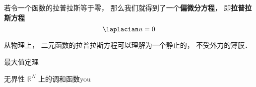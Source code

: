 

若令一个函数的拉普拉斯等于零， 那么我们就得到了一个\textbf{偏微分方程}，%
 即\textbf{拉普拉斯方程}
\begin{equation}
\laplacian u = 0
\end{equation}

从物理上， 二元函数的拉普拉斯方程可以理解为一个静止的， 不受外力的薄膜．

\begin{theorem}{最大值定理}

\end{theorem}

\begin{theorem}{无界性}
$\mathbb R^N$ 上的调和函数you
\end{theorem}

